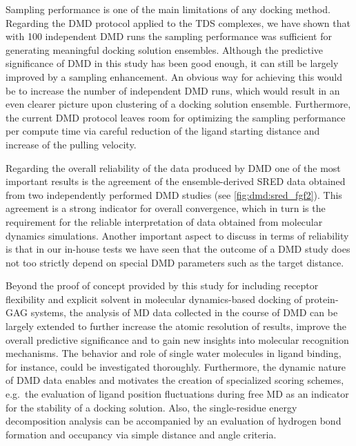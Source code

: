 Sampling performance is one of the main limitations of any docking method.
Regarding the DMD protocol applied to the TDS complexes, we have shown that with
100 independent DMD runs the sampling performance was sufficient for generating
meaningful docking solution ensembles. Although the predictive significance of
DMD in this study has been good enough, it can still be largely improved by a
sampling enhancement. An obvious way for achieving this would be to increase the
number of independent DMD runs, which would result in an even clearer picture
upon clustering of a docking solution ensemble. Furthermore, the current DMD
protocol leaves room for optimizing the sampling performance per compute time
via careful reduction of the ligand starting distance and increase of the
pulling velocity.

Regarding the overall reliability of the data produced by DMD one of the most
important results is the agreement of the ensemble-derived SRED data obtained
from two independently performed DMD studies (see \cref{fig:dmd:sred_fgf2}).
This agreement is a strong indicator for overall convergence, which in turn
is the requirement for the reliable interpretation of data obtained from
molecular dynamics simulations. Another important aspect to discuss in terms
of reliability is that in our in-house tests we have seen that the outcome
of a DMD study does not too strictly depend on special DMD parameters such as
the target distance.

Beyond the proof of concept provided by this study for including receptor
flexibility and explicit solvent in molecular dynamics-based docking of
protein-GAG systems, the analysis of MD data collected in the course of DMD can
be largely extended to further increase the atomic resolution of results,
improve the overall predictive significance and to gain new insights into
molecular recognition mechanisms. The behavior and role of single water
molecules in ligand binding, for instance, could be investigated thoroughly.
Furthermore, the dynamic nature of DMD data enables and motivates the creation
of specialized scoring schemes, e.g.\ the evaluation of ligand position
fluctuations during free MD as an indicator for the stability of a docking
solution. Also, the single-residue energy decomposition analysis can be
accompanied by an evaluation of hydrogen bond formation and occupancy via simple
distance and angle criteria.

